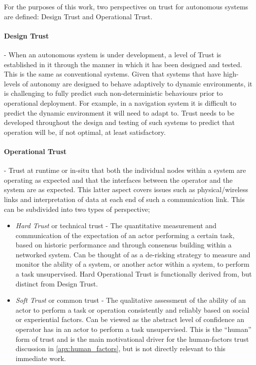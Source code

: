 For the purposes of this work, two perspectives on trust for autonomous systems are defined: Design Trust and Operational Trust.

\paragraph{Design Trust} - When an autonomous system is under development, a level of Trust is established in it through the manner in which it has been designed and tested.
    This is the same as conventional systems.
    Given that systems that have high-levels of autonomy are designed to behave adaptively to dynamic environments, it is challenging to fully predict such non-deterministic behaviours prior to operational deployment.
    For example, in a navigation system it is difficult to predict the dynamic environment it will need to adapt to.
    Trust needs to be developed throughout the design and testing of such systems to predict that operation will be, if not optimal, at least satisfactory.

\paragraph{Operational Trust} - Trust at runtime or in-situ that both the individual nodes within a system are operating as expected and that the interfaces between the operator and the system are as expected.
    This latter aspect covers issues such as physical/wireless links and interpretation of data at each end of such a communication link.
    This can be subdivided into two types of perspective;
    \begin{itemize}
      \item \emph{Hard Trust} or technical trust - The quantitative measurement and communication of the expectation of an actor performing a certain task, based on historic performance and through consensus building within a networked system.
    Can be thought of as a de-risking strategy to measure and monitor the ability of a system, or another actor within a system, to perform a task unsupervised.
    Hard Operational Trust is functionally derived from, but distinct from Design Trust.
  \item \emph{Soft Trust} or common trust - The qualitative assessment of the ability of an actor to perform a task or operation consistently and reliably based on social or experiential factors.
    Can be viewed as the abstract level of confidence an operator has in an actor to perform a task unsupervised.
    This is the ``human'' form of trust and is the main motivational driver for the human-factors trust discussion in \autoref{apx:human_factors}, but is not directly relevant to this immediate work.

    \end{itemize}


